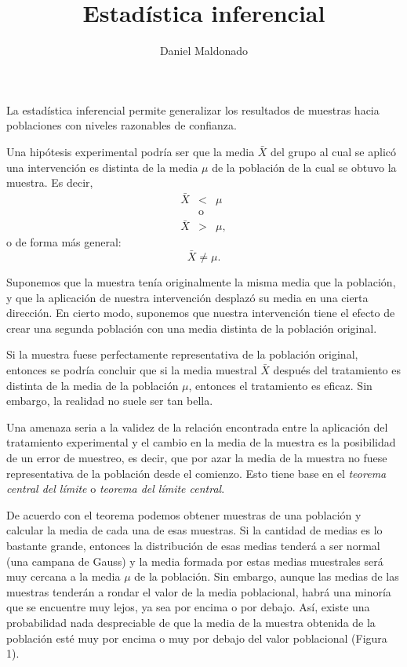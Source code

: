 \documentclass[a4paper,12pt]{article}
\title{Estadística inferencial}
\author{Daniel Maldonado}
\date{}
\begin{document}
{\scshape\bfseries \maketitle}

La estadística inferencial permite generalizar los resultados de muestras hacia poblaciones con niveles razonables de confianza.

Una hipótesis experimental podría ser que la media $\bar{X}$ del grupo al cual se aplicó una intervención es distinta de la media $\mu$ de la población de la cual se obtuvo la muestra. Es decir,
\begin{eqnarray*}
    \bar{X} &<& \mu\\
            &\mbox{o}&\\
    \bar{X} &>& \mu,
\end{eqnarray*}
o de forma más general:
\[
    \bar{X} \neq \mu
.\]

Suponemos que la muestra tenía originalmente la misma media que la población, y que la aplicación de nuestra intervención desplazó su media en una cierta dirección. En cierto modo, suponemos que nuestra intervención tiene el efecto de crear una segunda población con una media distinta de la población original.

Si la muestra fuese perfectamente representativa de la población original, entonces se podría concluir que si la media muestral $\bar{X}$ después del tratamiento es distinta de la media de la población $\mu$, entonces el tratamiento es eficaz. Sin embargo, la realidad no suele ser tan bella.

Una amenaza seria a la validez de la relación encontrada entre la aplicación del tratamiento experimental y el cambio en la media de la muestra es la posibilidad de un error de muestreo, es decir, que por azar la media de la muestra no fuese representativa de la población desde el comienzo. Esto tiene base en el {\slshape teorema central del límite} o {\slshape teorema del límite central}.

De acuerdo con el teorema podemos obtener muestras de una población y calcular la media de cada una de esas muestras. Si la cantidad de medias es lo bastante grande, entonces la distribución de esas medias tenderá a ser normal (una campana de Gauss) y la media formada por estas medias muestrales será muy cercana a la media $\mu$ de la población. Sin embargo, aunque las medias de las muestras tenderán a rondar el valor de la media poblacional, habrá una minoría que se encuentre muy lejos, ya sea por encima o por debajo. Así, existe una probabilidad nada despreciable de que la media de la muestra obtenida de la población esté muy por encima o muy por debajo del valor poblacional (Figura 1).
\end{document}

